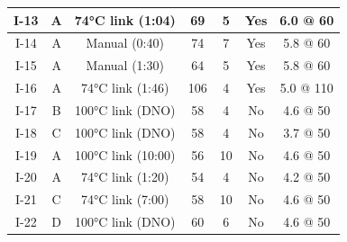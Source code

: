 \begin{table}[h!]
\begin{tabular}{|c||c|c|c|c|c|c|}
I-13  & A  & 74\unit{\degreeCelsius} link (1:04)    & 69            & 5         & Yes  & 6.0 @ 60  \\ \hline
I-14  & A  & Manual (0:40)              & 74            & 7         & Yes  & 5.8 @ 60  \\ \hline
I-15  & A  & Manual (1:30)              & 64            & 5         & Yes  & 5.8 @ 60  \\ \hline
I-16  & A  & 74\unit{\degreeCelsius} link (1:46)    & 106           & 4         & Yes  & 5.0 @ 110 \\ \hline \hline
I-17  & B  & 100\unit{\degreeCelsius} link (DNO)    & 58            & 4         & No   & 4.6 @ 50 \\ \hline
I-18  & C  & 100\unit{\degreeCelsius} link (DNO)    & 58            & 4         & No   & 3.7 @ 50 \\ \hline
I-19  & A  & 100\unit{\degreeCelsius} link (10:00)  & 56            & 10        & No   & 4.6 @ 50 \\ \hline
I-20  & A  & 74\unit{\degreeCelsius} link (1:20)    & 54            & 4         & No   & 4.2 @ 50 \\ \hline
I-21  & C  & 74\unit{\degreeCelsius} link (7:00)    & 58            & 10        & No   & 4.6 @ 50 \\ \hline
I-22  & D  & 100\unit{\degreeCelsius} link (DNO)    & 60            & 6         & No   & 4.6 @ 50 \\ \hline
\end{tabular}
\end{table}

